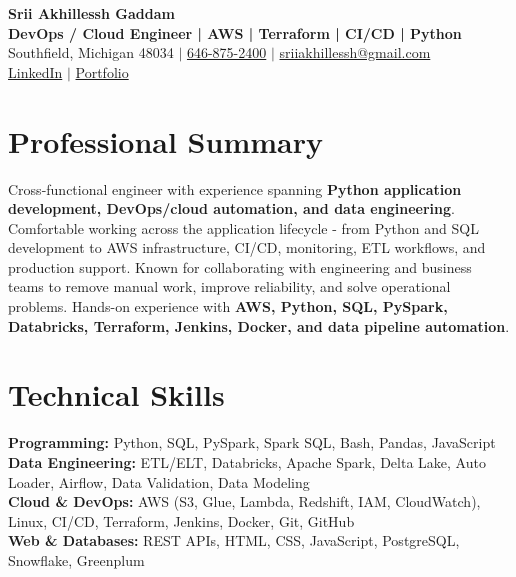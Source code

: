 \documentclass[letterpaper,10pt]{article}
\begin{document}
\fontsize{9.35pt}{10.45pt}\selectfont

\begin{center}
    {\LARGE \textbf{Srii Akhillessh Gaddam}} \\[-1pt]
    \textbf{DevOps / Cloud Engineer | AWS | Terraform | CI/CD | Python} \\[2pt]
    Southfield, Michigan 48034 $|$
    \href{tel:6468752400}{646-875-2400} $|$
    \href{mailto:sriiakhillessh@gmail.com}{sriiakhillessh@gmail.com} \\[1pt]
    \href{https://www.linkedin.com/in/srii-akhiilessh-gaddam-b48668191/}{LinkedIn} $|$
    \href{https://sriiakhillesshg.github.io/portfolio/}{Portfolio}
\end{center}
\vspace{-8pt}

\section{Professional Summary}
\small{Cross-functional engineer with experience spanning \textbf{Python application development, DevOps/cloud automation, and data engineering}. Comfortable working across the application lifecycle - from Python and SQL development to AWS infrastructure, CI/CD, monitoring, ETL workflows, and production support. Known for collaborating with engineering and business teams to remove manual work, improve reliability, and solve operational problems. Hands-on experience with \textbf{AWS, Python, SQL, PySpark, Databricks, Terraform, Jenkins, Docker, and data pipeline automation}.}

\section{Technical Skills}
\small{
\textbf{Programming:} Python, SQL, PySpark, Spark SQL, Bash, Pandas, JavaScript \\
\textbf{Data Engineering:} ETL/ELT, Databricks, Apache Spark, Delta Lake, Auto Loader, Airflow, Data Validation, Data Modeling \\
\textbf{Cloud \& DevOps:} AWS (S3, Glue, Lambda, Redshift, IAM, CloudWatch), Linux, CI/CD, Terraform, Jenkins, Docker, Git, GitHub \\
\textbf{Web \& Databases:} REST APIs, HTML, CSS, JavaScript, PostgreSQL, Snowflake, Greenplum
}
\end{document}
